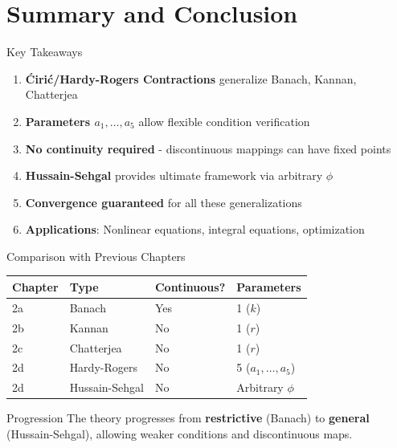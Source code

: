 \documentclass[aspectratio=169,10pt]{beamer}
\begin{document}
\section{Summary and Conclusion}

\begin{frame}{Key Takeaways}
    \begin{enumerate}
        \setlength\itemsep{0.4cm}
        \item \textbf{Ćirić/Hardy-Rogers Contractions} generalize Banach, Kannan, Chatterjea
        \item \textbf{Parameters $a_1, \ldots, a_5$} allow flexible condition verification
        \item \textbf{No continuity required} - discontinuous mappings can have fixed points
        \item \textbf{Hussain-Sehgal} provides ultimate framework via arbitrary $\phi$
        \item \textbf{Convergence guaranteed} for all these generalizations
        \item \textbf{Applications}: Nonlinear equations, integral equations, optimization
    \end{enumerate}
\end{frame}

\begin{frame}{Comparison with Previous Chapters}
    \begin{center}
        \begin{tabular}{llll}
            \toprule
            \textbf{Chapter} & \textbf{Type} & \textbf{Continuous?} & \textbf{Parameters} \\
            \midrule
            2a & Banach & Yes & 1 ($k$) \\
            2b & Kannan & No & 1 ($r$) \\
            2c & Chatterjea & No & 1 ($r$) \\
            2d & Hardy-Rogers & No & 5 ($a_1, \ldots, a_5$) \\
            2d & Hussain-Sehgal & No & Arbitrary $\phi$ \\
            \bottomrule
        \end{tabular}
    \end{center}

    \vspace{0.5cm}
    \begin{block}{Progression}
        The theory progresses from \textbf{restrictive} (Banach)
        to \textbf{general} (Hussain-Sehgal),
        allowing weaker conditions and discontinuous maps.
    \end{block}
\end{frame}
\end{document}
